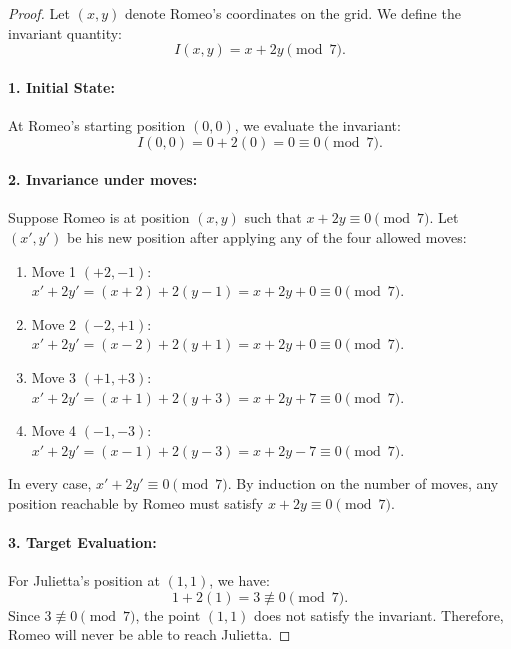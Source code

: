 \documentclass[12pt]{article}
\begin{document}
\begin{proof}
Let \((x, y)\) denote Romeo's coordinates on the grid. We define the invariant quantity:
\[
I(x, y) = x + 2y \pmod 7.
\]

\paragraph{1. Initial State:}
At Romeo's starting position \((0, 0)\), we evaluate the invariant:
\[
I(0, 0) = 0 + 2(0) = 0 \equiv 0 \pmod 7.
\]

\paragraph{2. Invariance under moves:}
Suppose Romeo is at position \((x, y)\) such that \(x + 2y \equiv 0 \pmod 7\). Let \((x', y')\) be his new position after applying any of the four allowed moves:
\begin{enumerate}
    \item Move 1 \((+2, -1)\): \(x' + 2y' = (x + 2) + 2(y - 1) = x + 2y + 0 \equiv 0 \pmod 7\).
    \item Move 2 \((-2, +1)\): \(x' + 2y' = (x - 2) + 2(y + 1) = x + 2y + 0 \equiv 0 \pmod 7\).
    \item Move 3 \((+1, +3)\): \(x' + 2y' = (x + 1) + 2(y + 3) = x + 2y + 7 \equiv 0 \pmod 7\).
    \item Move 4 \((-1, -3)\): \(x' + 2y' = (x - 1) + 2(y - 3) = x + 2y - 7 \equiv 0 \pmod 7\).
\end{enumerate}
In every case, \(x' + 2y' \equiv 0 \pmod 7\). By induction on the number of moves, any position reachable by Romeo must satisfy \(x + 2y \equiv 0 \pmod 7\).

\paragraph{3. Target Evaluation:}
For Julietta's position at \((1, 1)\), we have:
\[
1 + 2(1) = 3 \not\equiv 0 \pmod 7.
\]
Since \(3 \not\equiv 0 \pmod 7\), the point \((1, 1)\) does not satisfy the invariant. Therefore, Romeo will never be able to reach Julietta.
\end{proof}
\end{document}
